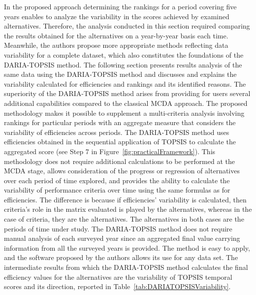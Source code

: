 \documentclass[5p,times]{elsarticle}
\begin{document}
In the proposed approach determining the rankings for a period covering five years enables to analyze the variability in the scores achieved by examined alternatives. Therefore, the analysis conducted in this section required comparing the results obtained for the alternatives on a year-by-year basis each time. Meanwhile, the authors propose more appropriate methods reflecting data variability for a complete dataset, which also constitutes the foundations of the DARIA-TOPSIS method. The following section presents results analysis of the same data using the DARIA-TOPSIS method and discusses and explains the variability calculated for efficiencies and rankings and its identified reasons. The superiority of the DARIA-TOPSIS method arises from providing for users several additional capabilities compared to the classical MCDA approach. The proposed methodology makes it possible to supplement a multi-criteria analysis involving rankings for particular periods with an aggregate measure that considers the variability of efficiencies across periods. The DARIA-TOPSIS method uses efficiencies obtained in the sequential application of TOPSIS to calculate the aggregated score (see Step 7 in Figure~\ref{fig:practicalFramework}). This methodology does not require additional calculations to be performed at the MCDA stage, allows consideration of the progress or regression of alternatives over each period of time explored, and provides the ability to calculate the variability of performance criteria over time using the same formulas as for efficiencies. The difference is because if efficiencies' variability is calculated, then criteria's role in the matrix evaluated is played by the alternatives, whereas in the case of criteria, they are the alternatives. The alternatives in both cases are the periods of time under study. The DARIA-TOPSIS method does not require manual analysis of each surveyed year since an aggregated final value carrying information from all the surveyed years is provided. The method is easy to apply, and the software proposed by the authors allows its use for any data set. The intermediate results from which the DARIA-TOPSIS method calculates the final efficiency values for the alternatives are the variability of TOPSIS temporal scores and its direction, reported in Table~\ref{tab:DARIATOPSISVariability}.
%
\end{document}
